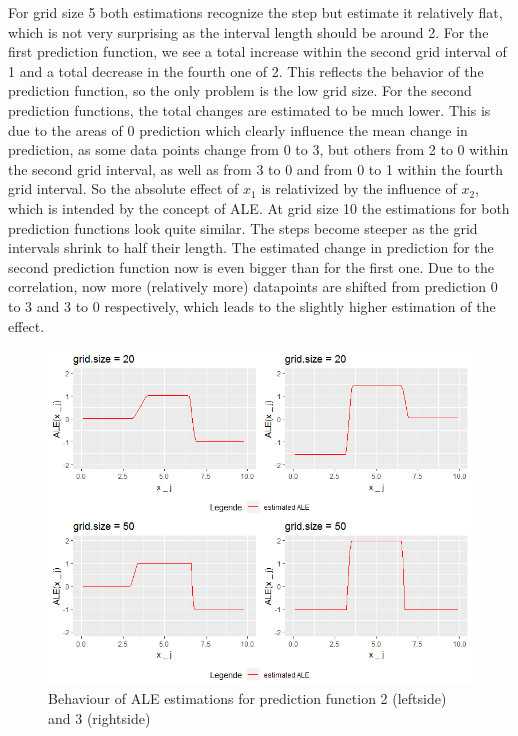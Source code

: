 \documentclass[
]{krantz}
\begin{document}
For grid size 5 both estimations recognize the step but estimate it relatively flat, which is not very surprising as the interval length should be around 2. For the first prediction function, we see a total increase within the second grid interval of 1 and a total decrease in the fourth one of 2. This reflects the behavior of the prediction function, so the only problem is the low grid size. For the second prediction functions, the total changes are estimated to be much lower. This is due to the areas of 0 prediction which clearly influence the mean change in prediction, as some data points change from 0 to 3, but others from 2 to 0 within the second grid interval, as well as from 3 to 0 and from 0 to 1 within the fourth grid interval. So the absolute effect of \(x_1\) is relativized by the influence of \(x_2\), which is intended by the concept of ALE.
At grid size 10 the estimations for both prediction functions look quite similar. The steps become steeper as the grid intervals shrink to half their length. The estimated change in prediction for the second prediction function now is even bigger than for the first one. Due to the correlation, now more (relatively more) datapoints are shifted from prediction 0 to 3 and 3 to 0 respectively, which leads to the slightly higher estimation of the effect.

\begin{figure}
\includegraphics[width=1\linewidth]{images/ALE_2_pwc_example5_gs20_50_} \caption{Behaviour of ALE estimations for prediction function 2 (leftside) and 3 (rightside)}\label{fig:pwcexample5gs2050}
\end{figure}
\end{document}
